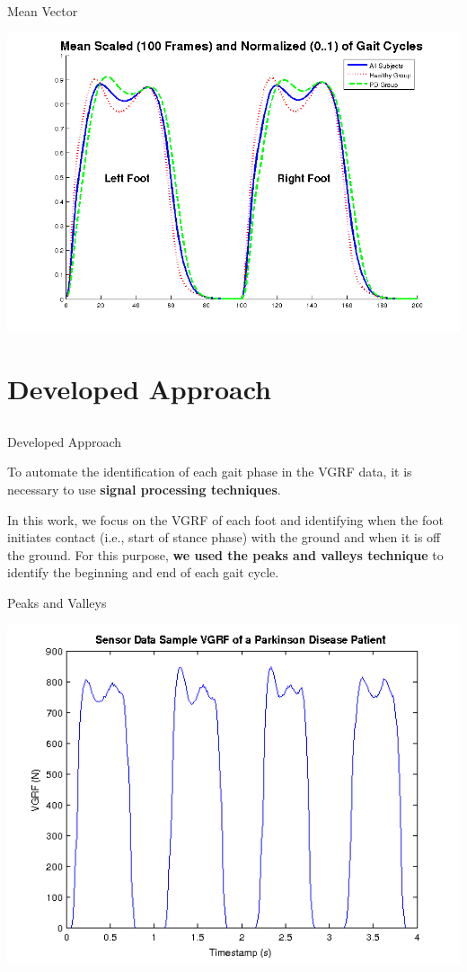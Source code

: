 \documentclass{beamer}
\begin{document}
\begin{frame}{Mean Vector}
		 \begin{block}{}
			\begin{center}
				\includegraphics[height=2.2 in]{img/meangait.png}
			\end{center}
		 \end{block}		
\end{frame}

\section{Developed Approach}
\subsection{}
\begin{frame}{Developed Approach}
	\begin{block}{}
	To automate the identification of each gait phase in the VGRF data, it is necessary to use \textbf{signal processing techniques}. 
	\end{block}
	
	\begin{block}{}
	In this work, we focus on the VGRF of each foot and identifying when the foot initiates contact (i.e., start of stance phase) with the ground and when it is off the ground. For this purpose, \textbf{we used the peaks and valleys technique} to identify the beginning and end of each gait cycle.
	\end{block}
\end{frame}

\begin{frame}{Peaks and Valleys}
	\begin{block}{}
		\begin{center}
				\includegraphics[height=2.2 in]{img/sampleRawData.png}
		\end{center}
	\end{block}
\end{frame}
\end{document}
